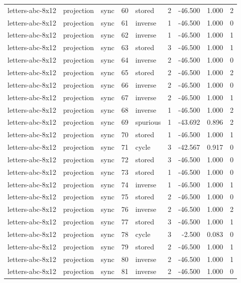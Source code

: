 \begin{tabular}{lllrlrrrr}
letters-abc-8x12 & projection & sync & 60 & stored & 2 & -46.500 & 1.000 & 2 \\
letters-abc-8x12 & projection & sync & 61 & inverse & 1 & -46.500 & 1.000 & 0 \\
letters-abc-8x12 & projection & sync & 62 & inverse & 1 & -46.500 & 1.000 & 1 \\
letters-abc-8x12 & projection & sync & 63 & stored & 3 & -46.500 & 1.000 & 1 \\
letters-abc-8x12 & projection & sync & 64 & inverse & 2 & -46.500 & 1.000 & 0 \\
letters-abc-8x12 & projection & sync & 65 & stored & 2 & -46.500 & 1.000 & 2 \\
letters-abc-8x12 & projection & sync & 66 & inverse & 2 & -46.500 & 1.000 & 0 \\
letters-abc-8x12 & projection & sync & 67 & inverse & 2 & -46.500 & 1.000 & 1 \\
letters-abc-8x12 & projection & sync & 68 & inverse & 1 & -46.500 & 1.000 & 2 \\
letters-abc-8x12 & projection & sync & 69 & spurious & 1 & -43.692 & 0.896 & 2 \\
letters-abc-8x12 & projection & sync & 70 & stored & 1 & -46.500 & 1.000 & 1 \\
letters-abc-8x12 & projection & sync & 71 & cycle & 3 & -42.567 & 0.917 & 0 \\
letters-abc-8x12 & projection & sync & 72 & stored & 3 & -46.500 & 1.000 & 0 \\
letters-abc-8x12 & projection & sync & 73 & stored & 1 & -46.500 & 1.000 & 0 \\
letters-abc-8x12 & projection & sync & 74 & inverse & 1 & -46.500 & 1.000 & 1 \\
letters-abc-8x12 & projection & sync & 75 & stored & 2 & -46.500 & 1.000 & 0 \\
letters-abc-8x12 & projection & sync & 76 & inverse & 2 & -46.500 & 1.000 & 2 \\
letters-abc-8x12 & projection & sync & 77 & stored & 3 & -46.500 & 1.000 & 1 \\
letters-abc-8x12 & projection & sync & 78 & cycle & 3 & -2.500 & 0.083 & 0 \\
letters-abc-8x12 & projection & sync & 79 & stored & 2 & -46.500 & 1.000 & 1 \\
letters-abc-8x12 & projection & sync & 80 & inverse & 2 & -46.500 & 1.000 & 1 \\
letters-abc-8x12 & projection & sync & 81 & inverse & 2 & -46.500 & 1.000 & 0 \\

\end{tabular}

